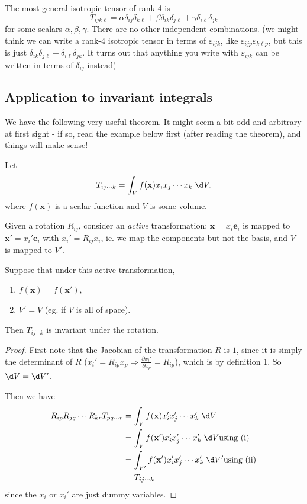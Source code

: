 \documentclass[a4paper]{article}
\begin{document}
\begin{eg}
  The most general isotropic tensor of rank 4 is
  \[
    T_{ijk\ell} = \alpha \delta_{ij}\delta_{k\ell} + \beta \delta_{ik}\delta_{j\ell} + \gamma \delta_{i\ell}\delta_{jk}
  \]
  for some scalars $\alpha, \beta, \gamma$. There are no other independent combinations. (we might think we can write a rank-4 isotropic tensor in terms of $\varepsilon_{ijk}$, like $\varepsilon_{ijp}\varepsilon_{k\ell p}$, but this is just $\delta_{ik}\delta_{j\ell} - \delta_{i\ell}\delta_{jk}$. It turns out that anything you write with $\varepsilon_{ijk}$ can be written in terms of $\delta_{ij}$ instead)
\end{eg}

\subsection{Application to invariant integrals}
We have the following very useful theorem. It might seem a bit odd and arbitrary at first sight - if so, read the example below first (after reading the theorem), and things will make sense!
\begin{thm}
  Let
  \[
    T_{ij\cdots k} = \int_V f(\mathbf{x}) x_i x_j \cdots x_k\;\d V.
  \]
  where $f(\mathbf{x})$ is a scalar function and $V$ is some volume.

  Given a rotation $R_{ij}$, consider an \emph{active} transformation: $\mathbf{x} = x_i \mathbf{e}_i$ is mapped to $\mathbf{x}' = x_i' \mathbf{e}_i$ with $x_i' = R_{ij} x_i$, ie. we map the components but not the basis, and $V$ is mapped to $V'$.

  Suppose that under this active transformation,
  \begin{enumerate}
    \item $f(\mathbf{x}) = f(\mathbf{x}')$,
    \item $V' = V$ (eg. if $V$ is all of space).
  \end{enumerate}
  Then $T_{ij\cdots k}$ is invariant under the rotation.
\end{thm}

\begin{proof}
  First note that the Jacobian of the transformation $R$ is $1$, since it is simply the determinant of $R$ ($x_i' = R_{ip}x_p \Rightarrow \frac{\partial x_i'}{\partial x_p} = R_{ip}$), which is by definition 1. So $\d V = \d V'$.

  Then we have
  \begin{align*}
    R_{ip}R_{jq}\cdots R_{kr} T_{pq\cdots r} &= \int_V f(\mathbf{x})x_i' x_j' \cdots x_k' \;\d V\\
    &= \int_V f(\mathbf{x}')x_i' x_j' \cdots x_k'\;\d V\hfill\text{using (i)}\\
    &= \int_{V'} f(\mathbf{x}') x_i' x_j' \cdots x_k' \;\d V'\hfill\text{using (ii)}\\
    &= T_{ij\cdots k}
  \end{align*}
  since the $x_i$ or $x_i'$ are just dummy variables.
\end{proof}
\end{document}
